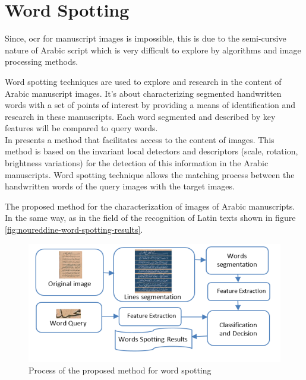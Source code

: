 \section{Word Spotting}
Since, \acrshort{ocr} for manuscript images is impossible, this is due to the semi-cursive nature of Arabic script which is very difficult to explore by algorithms and image processing methods.

\noindent
Word spotting techniques are used to explore and research in the content of Arabic manuscript images. It’s about characterizing segmented handwritten words with a set of points of interest by providing a means of identification and research in these manuscripts. Each word segmented and described by key features will be compared to query words. \\

In \cite{Noureddine} presents a method that facilitates access to the content of images. This method is based on the invariant local detectors and descriptors (scale, rotation, brightness variations) for the detection of this information in the Arabic manuscripts. Word spotting technique allows the matching process between the handwritten words of the query images with the target images. 

The proposed method for the characterization of images of Arabic manuscripts. In the same way, as in the field of the recognition of Latin texts shown in figure \ref{fig:noureddine-word-spotting-results}.
\begin{figure}[!htb]
    \centering
    \includegraphics[width=13cm]{images/noureddine-word-spotting.png}
    \caption{Process of the proposed method for word spotting}
    \label{fig:noureddine-word-spotting}
\end{figure}

